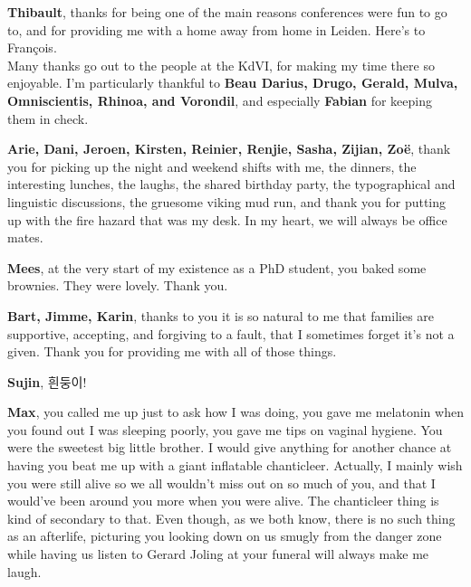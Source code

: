 {\bfseries Thibault}, thanks for being one of the main reasons conferences were fun to go to, and for providing me with a home away from home in Leiden. Here's to Fran\c{c}ois. \\

Many thanks go out to the people at the KdVI, for making my time there so enjoyable. I'm particularly thankful to {\bfseries Beau Darius, Drugo, Gerald, Mulva, Omniscientis, Rhinoa, and Vorondil}, and especially {\bfseries Fabian} for keeping them in check.

{\bfseries Arie, Dani, Jeroen, Kirsten, Reinier, Renjie, Sasha, Zijian, Zo\"e}, thank you for picking up the night and weekend shifts with me, the dinners, the interesting lunches, the laughs, the shared birthday party, the typographical and linguistic discussions, the gruesome viking mud run, and thank you for putting up with the fire hazard that was my desk. In my heart, we will always be office mates.

{{\bfseries Mees}, at the very start of my existence as a PhD student, you baked some brownies. They were lovely. Thank you.}

{\bfseries Bart, Jimme, Karin}, thanks to you it is so natural to me that families are supportive, accepting, and forgiving to a fault, that I sometimes forget it's not a given. Thank you for providing me with all of those things.

{\bfseries Sujin}, 흰둥이!

{\bfseries Max}, you called me up just to ask how I was doing, you gave me melatonin when you found out I was sleeping poorly, you gave me tips on vaginal hygiene. You were the sweetest big little brother. I would give anything for another chance at having you beat me up with a giant inflatable chanticleer. Actually, I mainly wish you were still alive so we all wouldn't miss out on so much of you, and that I would've been around you more when you were alive. The chanticleer thing is kind of secondary to that. Even though, as we both know, there is no such thing as an afterlife, picturing you looking down on us smugly from the danger zone while having us listen to Gerard Joling at your funeral will always make me laugh.
